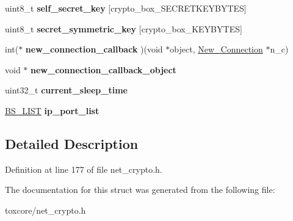 \begin{DoxyCompactItemize}
\item 
\hypertarget{struct_net___crypto_aa05050f86513ff53fe9da81f73c72267}{uint8\+\_\+t {\bfseries self\+\_\+secret\+\_\+key} \mbox{[}crypto\+\_\+box\+\_\+\+S\+E\+C\+R\+E\+T\+K\+E\+Y\+B\+Y\+T\+E\+S\mbox{]}}\label{struct_net___crypto_aa05050f86513ff53fe9da81f73c72267}

\item 
\hypertarget{struct_net___crypto_ab9f2ff47bc0b1e5110202a6e4be86390}{uint8\+\_\+t {\bfseries secret\+\_\+symmetric\+\_\+key} \mbox{[}crypto\+\_\+box\+\_\+\+K\+E\+Y\+B\+Y\+T\+E\+S\mbox{]}}\label{struct_net___crypto_ab9f2ff47bc0b1e5110202a6e4be86390}

\item 
\hypertarget{struct_net___crypto_a4e2c131b4a4b4ccb2acc140c29c628be}{int($\ast$ {\bfseries new\+\_\+connection\+\_\+callback} )(void $\ast$object, \hyperlink{struct_new___connection}{New\+\_\+\+Connection} $\ast$n\+\_\+c)}\label{struct_net___crypto_a4e2c131b4a4b4ccb2acc140c29c628be}

\item 
\hypertarget{struct_net___crypto_af28bac95ede5cab8426b07e02dd1a1b0}{void $\ast$ {\bfseries new\+\_\+connection\+\_\+callback\+\_\+object}}\label{struct_net___crypto_af28bac95ede5cab8426b07e02dd1a1b0}

\item 
\hypertarget{struct_net___crypto_a86823a02e323235811eada4755e3f81e}{uint32\+\_\+t {\bfseries current\+\_\+sleep\+\_\+time}}\label{struct_net___crypto_a86823a02e323235811eada4755e3f81e}

\item 
\hypertarget{struct_net___crypto_ae8cfe94df9c9030bbc525010603450ac}{\hyperlink{struct_b_s___l_i_s_t}{B\+S\+\_\+\+L\+I\+S\+T} {\bfseries ip\+\_\+port\+\_\+list}}\label{struct_net___crypto_ae8cfe94df9c9030bbc525010603450ac}

\end{DoxyCompactItemize}


\subsection{Detailed Description}


Definition at line 177 of file net\+\_\+crypto.\+h.



The documentation for this struct was generated from the following file\+:\begin{DoxyCompactItemize}
\item 
toxcore/net\+\_\+crypto.\+h\end{DoxyCompactItemize}
